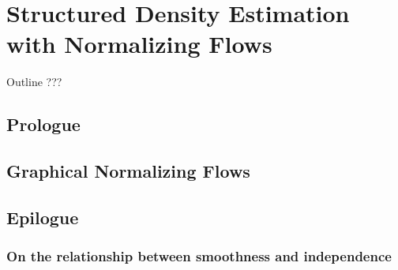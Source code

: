 \chapter{Structured Density Estimation with Normalizing Flows}\label{ch:06}

\begin{remark}{Outline}
???
\end{remark}
\section{Prologue}
\section{Graphical Normalizing Flows}


\section{Epilogue}
\subsection{On the relationship between smoothness and independence}
